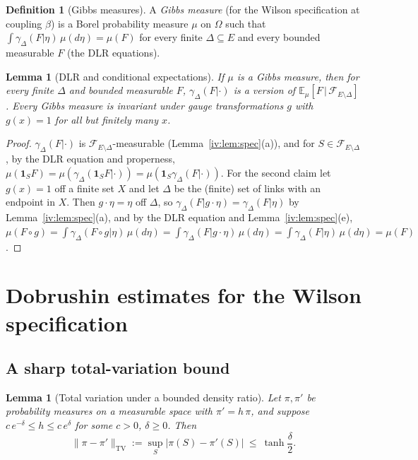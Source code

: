 \documentclass[11pt,a4paper]{article}
\newtheorem{lemma}[theorem]{Lemma}
\theoremstyle{definition}
\newtheorem{definition}[theorem]{Definition}
\theoremstyle{remark}
\newcommand{\E}{\mathbb{E}}
\newcommand{\cF}{\mathcal{F}}
\newcommand{\norm}[1]{\lVert #1\rVert}
\newcommand{\TV}{\mathrm{TV}}
\begin{document}
\begin{definition}[Gibbs measures]\label{iv:def:gibbs}
A \emph{Gibbs measure} (for the Wilson specification at coupling $\beta$) is a Borel probability measure $\mu$ on $\Omega$
such that $\int\gamma_\Delta(F|\eta)\,\mu(d\eta)=\mu(F)$ for every finite $\Delta\subseteq E$ and every bounded measurable $F$
(the DLR equations).
\end{definition}

\begin{lemma}[DLR and conditional expectations]\label{iv:lem:condexp}
If $\mu$ is a Gibbs measure, then for every finite $\Delta$ and bounded measurable $F$, $\gamma_\Delta(F|\cdot)$ is a version
of $\E_\mu[F\,|\,\cF_{E\setminus\Delta}]$. Every Gibbs measure is invariant under gauge transformations $g$ with $g(x)=1$
for all but finitely many $x$.
\end{lemma}

\begin{proof}
$\gamma_\Delta(F|\cdot)$ is $\cF_{E\setminus\Delta}$-measurable (Lemma~\ref{iv:lem:spec}(a)), and for $S\in\cF_{E\setminus\Delta}$,
by the DLR equation and properness, $\mu(\mathbf 1_SF)=\mu(\gamma_\Delta(\mathbf 1_SF|\cdot))=\mu(\mathbf 1_S\gamma_\Delta(F|\cdot))$.
For the second claim let $g(x)=1$ off a finite set $X$ and let $\Delta$ be the (finite) set of links with an endpoint in $X$.
Then $g\cdot\eta=\eta$ off $\Delta$, so $\gamma_\Delta(F|g\cdot\eta)=\gamma_\Delta(F|\eta)$ by Lemma~\ref{iv:lem:spec}(a), and
by the DLR equation and Lemma~\ref{iv:lem:spec}(e),
$\mu(F\circ g)=\int\gamma_\Delta(F\circ g|\eta)\,\mu(d\eta)=\int\gamma_\Delta(F|g\cdot\eta)\,\mu(d\eta)=\int\gamma_\Delta(F|\eta)\,\mu(d\eta)=\mu(F)$.
\end{proof}

\section{Dobrushin estimates for the Wilson specification}\label{iv:sec:dobrushin}

\subsection{A sharp total-variation bound}

\begin{lemma}[Total variation under a bounded density ratio]\label{iv:lem:tvratio}
Let $\pi,\pi'$ be probability measures on a measurable space with $\pi'=h\,\pi$, and suppose $c\,e^{-\delta}\le h\le c\,e^{\delta}$
for some $c>0$, $\delta\ge0$. Then
\[
\norm{\pi-\pi'}_\TV:=\sup_S|\pi(S)-\pi'(S)|\ \le\ \tanh\frac\delta2 .
\]
\end{lemma}
\end{document}
